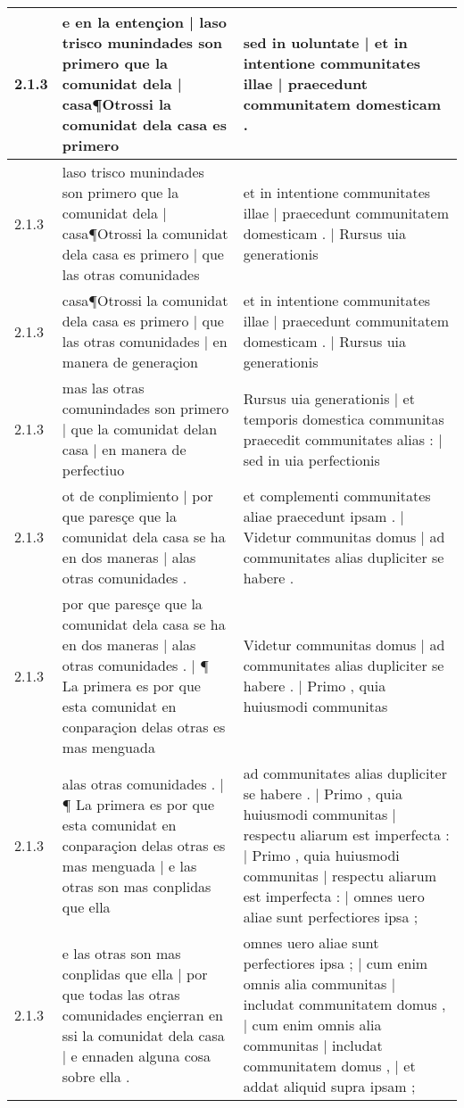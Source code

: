 \begin{tabular}{|p{1cm}|p{6.5cm}|p{6.5cm}|}
2.1.3 & e en la entençion | laso trisco munindades son primero que la comunidat dela | casa¶Otrossi la comunidat dela casa es primero & sed in uoluntate | et in intentione communitates illae | praecedunt communitatem domesticam . \\\hline
2.1.3 & laso trisco munindades son primero que la comunidat dela | casa¶Otrossi la comunidat dela casa es primero | que las otras comunidades & et in intentione communitates illae | praecedunt communitatem domesticam . | Rursus uia generationis \\\hline
2.1.3 & casa¶Otrossi la comunidat dela casa es primero | que las otras comunidades | en manera de generaçion & et in intentione communitates illae | praecedunt communitatem domesticam . | Rursus uia generationis \\\hline
2.1.3 & mas las otras comunindades son primero | que la comunidat delan casa | en manera de perfectiuo & Rursus uia generationis | et temporis domestica communitas praecedit communitates alias : | sed in uia perfectionis \\\hline
2.1.3 & ot de conplimiento | por que paresçe que la comunidat dela casa se ha en dos maneras | alas otras comunidades . & et complementi communitates aliae praecedunt ipsam . | Videtur communitas domus | ad communitates alias dupliciter se habere . \\\hline
2.1.3 & por que paresçe que la comunidat dela casa se ha en dos maneras | alas otras comunidades . | ¶ La primera es por que esta comunidat en conparaçion delas otras es mas menguada & Videtur communitas domus | ad communitates alias dupliciter se habere . | Primo , quia huiusmodi communitas \\\hline
2.1.3 & alas otras comunidades . | ¶ La primera es por que esta comunidat en conparaçion delas otras es mas menguada | e las otras son mas conplidas que ella & ad communitates alias dupliciter se habere . | Primo , quia huiusmodi communitas | respectu aliarum est imperfecta : | Primo , quia huiusmodi communitas | respectu aliarum est imperfecta : | omnes uero aliae sunt perfectiores ipsa ; \\\hline
2.1.3 & e las otras son mas conplidas que ella | por que todas las otras comunidades ençierran en ssi la comunidat dela casa | e ennaden alguna cosa sobre ella . & omnes uero aliae sunt perfectiores ipsa ; | cum enim omnis alia communitas | includat communitatem domus , | cum enim omnis alia communitas | includat communitatem domus , | et addat aliquid supra ipsam ; \\\hline

\end{tabular}
